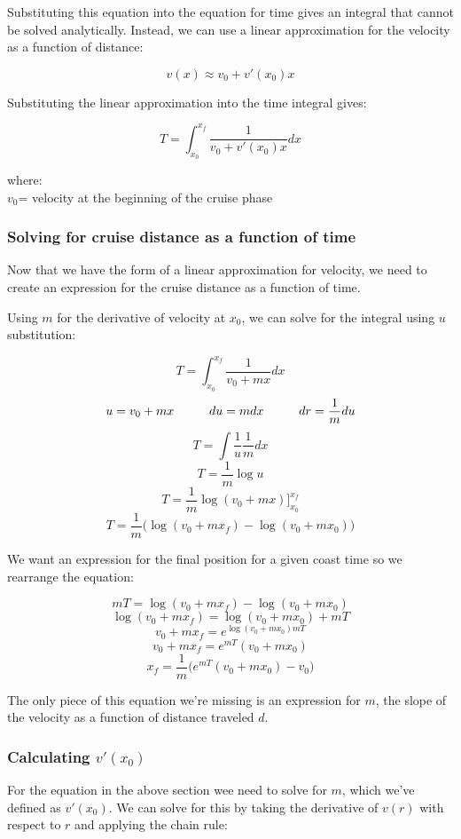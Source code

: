\documentclass[12pt]{article} %
\begin{document}
Substituting this equation into the equation for time gives an integral that cannot be solved analytically. Instead, we can use a linear approximation for the velocity as a function of distance:

$$v(x) \approx v_0 + v'(x_0)x$$

Substituting the linear approximation into the time integral gives:

$$\boxed{T = \int_{x_0}^{x_f} \frac{1}{v_0+v'(x_0)x} dx}$$

where:\\
$v_0$= velocity at the beginning of the cruise phase

\subsubsection{Solving for cruise distance as a function of time}

Now that we have the form of a linear approximation for velocity, we need to create an expression for the cruise distance as a function of time.

Using $m$ for the derivative of velocity at $x_0$, we can solve for the integral using $u$ substitution:

$$T = \int_{x_0}^{x_f} \frac{1}{v_0+mx} dx$$
$$u = v_0+mx\hspace{10mm}du = mdx\hspace{10mm}dr = \frac{1}{m}du$$
$$T = \int \frac{1}{u} \frac{1}{m}dx$$
$$T = \frac{1}{m} \log{u}$$
$$T = \frac{1}{m} \log{(v_0+mx)}\bigg]_{x_0}^{x_f}$$
$$T = \frac{1}{m} \bigg(\log{(v_0+mx_f)} - \log{(v_0+mx_0)}\bigg)$$

We want an expression for the final position for a given coast time so we rearrange the equation:

$$mT = \log{(v_0+mx_f)} - \log{(v_0+mx_0)}$$
$$\log{(v_0+mx_f)} = \log{(v_0+mx_0)} + mT$$
$$v_0 + mx_f = e^{\log{(v_0+mx_0)}{mT}}$$
$$v_0 + mx_f = e^{mT}(v_0+mx_0)$$
$$\boxed{x_f = \frac{1}{m}\bigg(e^{mT}(v_0+mx_0) - v_0\bigg)}$$


The only piece of this equation we're missing is an expression for $m$, the slope of the velocity as a function of distance traveled $d$. 

\subsubsection{Calculating $v'(x_0)$}

For the equation in the above section wee need to solve for $m$, which we've defined as $v'(x_0)$. We can solve for this by taking the derivative of $v(r)$ with respect to $r$ and applying the chain rule:
\end{document}
